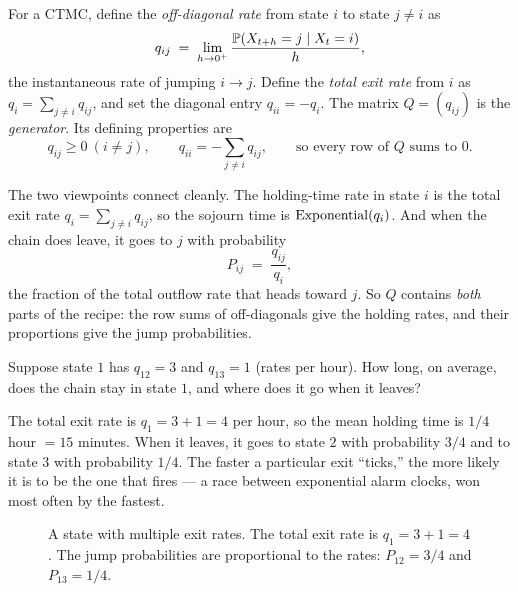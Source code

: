 \begin{definition}
\label{ch27:def-generator}
For a CTMC, define the \emph{off-diagonal rate} from state $i$ to state $j \ne i$ as
\[
  q_{ij} \;=\; \lim_{h \to 0^+} \frac{\operatorname{\mathbb{P}}(X_{t+h} = j \mid X_t = i)}{h},
\]
the instantaneous rate of jumping $i \to j$. Define the \emph{total exit rate} from $i$ as
$q_i = \sum_{j \ne i} q_{ij}$, and set the diagonal entry $q_{ii} = -q_i$. The matrix
$Q = (q_{ij})$ is the \emph{generator}. Its defining properties are
\[
  q_{ij} \ge 0 \ (i \ne j), \qquad q_{ii} = -\sum_{j \ne i} q_{ij},
  \qquad\text{so every row of } Q \text{ sums to } 0.
\]
\end{definition}

The two viewpoints connect cleanly. The holding-time rate in state $i$ is the total exit rate
$q_i = \sum_{j \ne i} q_{ij}$, so the sojourn time is $\operatorname{Exponential}(q_i)$. And when the chain does leave,
it goes to $j$ with probability
\[
  P_{ij} \;=\; \frac{q_{ij}}{q_i},
\]
the fraction of the total outflow rate that heads toward $j$. So $Q$ contains \emph{both} parts of
the recipe: the row sums of off-diagonals give the holding rates, and their proportions give the
jump probabilities.

\begin{walkbox}
Suppose state $1$ has $q_{12} = 3$ and $q_{13} = 1$ (rates per hour). How long, on average, does the
chain stay in state $1$, and where does it go when it leaves?

The total exit rate is $q_1 = 3 + 1 = 4$ per hour, so the mean holding time is $1/4$ hour $= 15$
minutes. When it leaves, it goes to state $2$ with probability $3/4$ and to state $3$ with
probability $1/4$. The faster a particular exit ``ticks,'' the more likely it is to be the one that
fires --- a race between exponential alarm clocks, won most often by the fastest.
\end{walkbox}

\begin{figure}[htbp]
\centering
{}
\caption{A state with multiple exit rates. The total exit rate is $q_1 = 3 + 1 = 4$. The jump probabilities are proportional to the rates: $P_{12} = 3/4$ and $P_{13} = 1/4$.}
\label{ch27:fig-walkbox-rates}
\end{figure}

